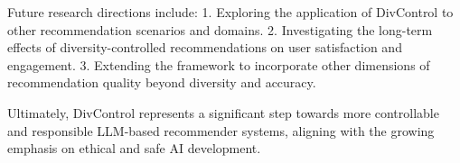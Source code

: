 \documentclass[10pt,twocolumn,letterpaper]{article}
\begin{document}
Future research directions include:
1. Exploring the application of DivControl to other recommendation scenarios and domains.
2. Investigating the long-term effects of diversity-controlled recommendations on user satisfaction and engagement.
3. Extending the framework to incorporate other dimensions of recommendation quality beyond diversity and accuracy.

Ultimately, DivControl represents a significant step towards more controllable and responsible LLM-based recommender systems, aligning with the growing emphasis on ethical and safe AI development.




\end{document}
